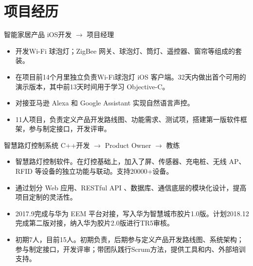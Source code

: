 \documentclass[10pt,a4paper]{moderncv/moderncv}
\begin{document}



\section{项目经历}

{智能家居产品}
{iOS开发 $\rightarrow$ 项目经理}
{}{}
{
\begin{itemize}
	\item 开发Wi-Fi 球泡灯；ZigBee 网关、球泡灯、筒灯、遥控器、窗帘等组成的套装。
	\item 在项目前14个月里独立负责Wi-Fi球泡灯 iOS 客户端。32天内做出首个可用的演示版本，其中前13天时间用于学习 Objective-C。
	\item 对接亚马逊 Alexa 和 Google Assistant 实现自然语言声控。
	\item 11人项目，负责定义产品开发路线图、功能需求、测试项，搭建第一版软件框架，参与制定接口，开发评审。
\end{itemize}
}

{智慧路灯控制系统}
{C++开发 $\rightarrow$ Product Owner $\rightarrow$ 教练}
{}{}
{
\begin{itemize}
	\item 智慧路灯控制软件。在灯控基础上，加入了屏、传感器、充电桩、无线 AP、RFID 等设备的独立功能与联动。支持20000+设备。
	\item 通过划分 Web 应用、RESTful API 、数据库、通信底层的模块化设计，提高项目定制的灵活性。
	\item 2017.9完成与华为 EEM 平台对接，写入华为智慧城市胶片1.0版。计划2018.12完成第二版对接，纳入华为胶片2.0版进行TR5审核。
	\item 初期7人，目前15人。初期负责，后期参与定义产品开发路线图、系统架构；参与制定接口，开发评审；带团队践行Scrum方法，提供工具和内、外部培训支持。
\end{itemize}
}
\end{document}
